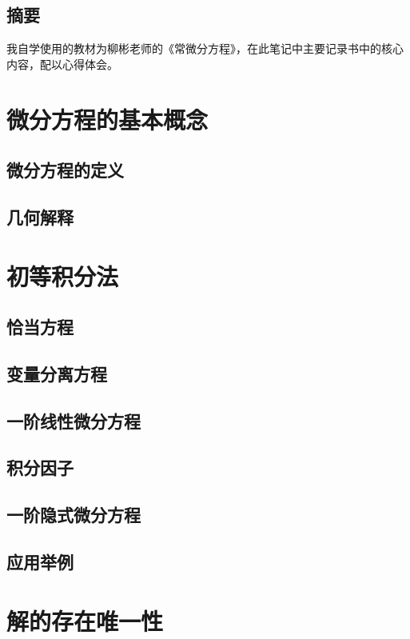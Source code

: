 \documentclass[12pt,a4paper]{article}
\begin{document}
\begin{center}
\section*{摘要}
\end{center}

我自学使用的教材为柳彬老师的《常微分方程》，在此笔记中主要记录书中的核心内容，配以心得体会。


{\centering\tableofcontents}

\newpage
\section{微分方程的基本概念}
\subsection{微分方程的定义}
\subsection{几何解释}

\newpage
\section{初等积分法}
\subsection{恰当方程}
\subsection{变量分离方程}
\subsection{一阶线性微分方程}
\subsection{积分因子}
\subsection{一阶隐式微分方程}
\subsection{应用举例}

\newpage
\section{解的存在唯一性}
\end{document}
